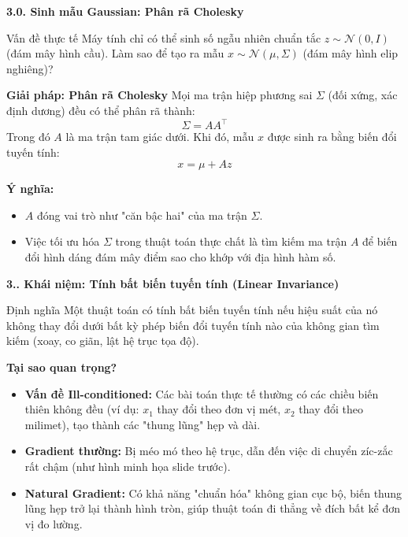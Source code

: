 \documentclass[10pt,xcolor=dvipsnames]{beamer}
\begin{document}
\begin{frame}{\textbf{3.0. Sinh mẫu Gaussian: Phân rã Cholesky}}
	\begin{alertblock}{Vấn đề thực tế}
		Máy tính chỉ có thể sinh số ngẫu nhiên chuẩn tắc $z \sim \mathcal{N}(0, I)$ (đám mây hình cầu). Làm sao để tạo ra mẫu $x \sim \mathcal{N}(\mu, \Sigma)$ (đám mây hình elip nghiêng)?
	\end{alertblock}
	
	\textbf{Giải pháp: Phân rã Cholesky}
	Mọi ma trận hiệp phương sai $\Sigma$ (đối xứng, xác định dương) đều có thể phân rã thành:
	\[ \Sigma = A A^\top \]
	Trong đó $A$ là ma trận tam giác dưới. Khi đó, mẫu $x$ được sinh ra bằng biến đổi tuyến tính:
	\[ x = \mu + A z \]
	
	\textbf{Ý nghĩa:}
	\begin{itemize}
		\item $A$ đóng vai trò như "căn bậc hai" của ma trận $\Sigma$.
		\item Việc tối ưu hóa $\Sigma$ trong thuật toán thực chất là tìm kiếm ma trận $A$ để biến đổi hình dáng đám mây điểm sao cho khớp với địa hình hàm số.
	\end{itemize}
\end{frame}

\begin{frame}{\textbf{3.. Khái niệm: Tính bất biến tuyến tính (Linear Invariance)}}
	\begin{block}{Định nghĩa}
		Một thuật toán có tính bất biến tuyến tính nếu hiệu suất của nó không thay đổi dưới bất kỳ phép biến đổi tuyến tính nào của không gian tìm kiếm (xoay, co giãn, lật hệ trục tọa độ).
	\end{block}
	
	\textbf{Tại sao quan trọng?}
	\begin{itemize}
		\item \textbf{Vấn đề Ill-conditioned:} Các bài toán thực tế thường có các chiều biến thiên không đều (ví dụ: $x_1$ thay đổi theo đơn vị mét, $x_2$ thay đổi theo milimet), tạo thành các "thung lũng" hẹp và dài.
		\item \textbf{Gradient thường:} Bị méo mó theo hệ trục, dẫn đến việc di chuyển zíc-zắc rất chậm (như hình minh họa slide trước).
		\item \textbf{Natural Gradient:} Có khả năng "chuẩn hóa" không gian cục bộ, biến thung lũng hẹp trở lại thành hình tròn, giúp thuật toán đi thẳng về đích bất kể đơn vị đo lường.
	\end{itemize}
\end{frame}
\end{document}
